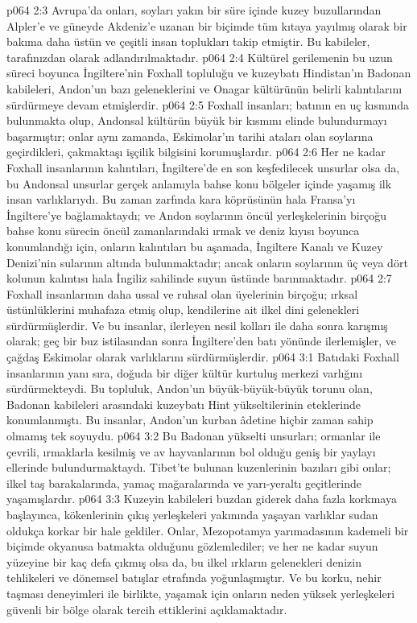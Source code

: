 \vs p064 2:3 Avrupa’da onları, soyları yakın bir süre içinde kuzey buzullarından Alpler’e ve güneyde Akdeniz’e uzanan bir biçimde tüm kıtaya yayılmış olarak bir bakıma daha üstün ve çeşitli insan toplukları takip etmiştir. Bu kabileler, tarafınızdan  olarak adlandırılmaktadır.
\vs p064 2:4 Kültürel gerilemenin bu uzun süreci boyunca İngiltere’nin Foxhall topluluğu ve kuzeybatı Hindistan’ın Badonan kabileleri, Andon’un bazı geleneklerini ve Onagar kültürünün belirli kalıntılarını sürdürmeye devam etmişlerdir.
\vs p064 2:5 Foxhall insanları; batının en uç kısmında bulunmakta olup, Andonsal kültürün büyük bir kısmını elinde bulundurmayı başarmıştır; onlar aynı zamanda, Eskimolar’ın tarihi ataları olan soylarına geçirdikleri, çakmaktaşı işçilik bilgisini korumuşlardır.
\vs p064 2:6 Her ne kadar Foxhall insanlarının kalıntıları, İngiltere’de en son keşfedilecek unsurlar olsa da, bu Andonsal unsurlar gerçek anlamıyla bahse konu bölgeler içinde yaşamış ilk insan varlıklarıydı. Bu zaman zarfında kara köprüsünün hala Fransa’yı İngiltere’ye bağlamaktaydı; ve Andon soylarının öncül yerleşkelerinin birçoğu bahse konu sürecin öncül zamanlarındaki ırmak ve deniz kıyısı boyunca konumlandığı için, onların kalıntıları bu aşamada, İngiltere Kanalı ve Kuzey Denizi’nin sularının altında bulunmaktadır; ancak onların soylarının üç veya dört kolunun kalıntısı hala İngiliz sahilinde suyun üstünde barınmaktadır.
\vs p064 2:7 Foxhall insanlarının daha ussal ve ruhsal olan üyelerinin birçoğu; ırksal üstünlüklerini muhafaza etmiş olup, kendilerine ait ilkel dini gelenekleri sürdürmüşlerdir. Ve bu insanlar, ilerleyen nesil kolları ile daha sonra karışmış olarak; geç bir buz istilasından sonra İngiltere’den batı yönünde ilerlemişler, ve çağdaş Eskimolar olarak varlıklarını sürdürmüşlerdir.
\vs p064 3:1 Batıdaki Foxhall insanlarının yanı sıra, doğuda bir diğer kültür kurtuluş merkezi varlığını sürdürmekteydi. Bu topluluk, Andon’un büyük\hyp{}büyük\hyp{}büyük torunu olan, Badonan kabileleri arasındaki kuzeybatı Hint yükseltilerinin eteklerinde konumlanmıştı. Bu insanlar, Andon’un kurban âdetine hiçbir zaman sahip olmamış tek soyuydu.
\vs p064 3:2 Bu Badonan yükselti unsurları; ormanlar ile çevrili, ırmaklarla kesilmiş ve av hayvanlarının bol olduğu geniş bir yaylayı ellerinde bulundurmaktaydı. Tibet’te bulunan kuzenlerinin bazıları gibi onlar; ilkel taş barakalarında, yamaç mağaralarında ve yarı\hyp{}yeraltı geçitlerinde yaşamışlardır.
\vs p064 3:3 Kuzeyin kabileleri buzdan giderek daha fazla korkmaya başlayınca, kökenlerinin çıkış yerleşkeleri yakınında yaşayan varlıklar sudan oldukça korkar bir hale geldiler. Onlar, Mezopotamya yarımadasının kademeli bir biçimde okyanusa batmakta olduğunu gözlemlediler; ve her ne kadar suyun yüzeyine bir kaç defa çıkmış olsa da, bu ilkel ırkların gelenekleri denizin tehlikeleri ve dönemsel batışlar etrafında yoğunlaşmıştır. Ve bu korku, nehir taşması deneyimleri ile birlikte, yaşamak için onların neden yüksek yerleşkeleri güvenli bir bölge olarak tercih ettiklerini açıklamaktadır.
